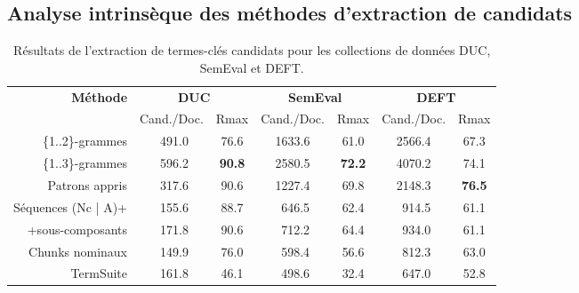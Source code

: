   \subsection{Analyse intrinsèque des méthodes d'extraction de candidats}
  \label{subsec:analyse_intrinseque_des_methodes_d_extraction_de_candidats}
    \begin{table}
      \centering
      \begin{tabular}{@{~}r@{~~}c@{~~}cc@{~~}cc@{~~}c@{~}}
        \toprule
        \multirow{2}{*}[-2pt]{\textbf{Méthode}} & \multicolumn{2}{c}{\textbf{DUC}} & \multicolumn{2}{c}{\textbf{SemEval}} & \multicolumn{2}{c}{\textbf{DEFT}}\\
        \cmidrule(r){2-3}\cmidrule(lr){4-5}\cmidrule(l){6-7}
        & Cand./Doc. & Rmax & Cand./Doc. & Rmax & Cand./Doc. & Rmax\\
        \midrule
        \{1..2\}-grammes & $~~$491.0 & 76.6 & 1633.6 & 61.0 & 2566.4 & 67.3\\
        \{1..3\}-grammes & $~~$596.2 & \textbf{90.8} & 2580.5 & \textbf{72.2} & 4070.2 & 74.1\\
        Patrons appris & $~~$317.6 & 90.6 & 1227.4 & 69.8 & 2148.3 & \textbf{76.5}\\
        Séquences (Nc | A)+ & $~~$155.6 & 88.7 & $~~$646.5 & 62.4 & $~~$914.5 & 61.1\\
        +sous-composants & $~~$171.8 & 90.6 & $~~$712.2 & 64.4 & $~~$934.0 & 61.1\\
        Chunks nominaux & $~~$149.9 & 76.0 & $~~$598.4 & 56.6 & $~~$812.3 & 63.0\\
        TermSuite & $~~$161.8 & 46.1 & $~~$498.6 & 32.4 & $~~$647.0 & 52.8\\
        \bottomrule
      \end{tabular}
      \caption{Résultats de l'extraction de termes-clés candidats pour les
               collections de données DUC, SemEval et DEFT.
               \label{tab:resultats_de_l_extraction_de_candidats}}
    \end{table}

